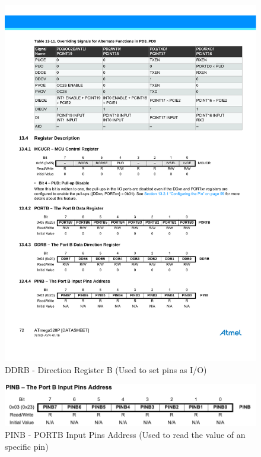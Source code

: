 \begin{figure}[H]
    \centering
    \includegraphics[width = \textwidth]{Graphics/MICROS/Practice 1/DATSHEET/DDRB.pdf}
    \caption{DDRB - Direction Register B (Used to set pins as I/O)}
    \label{fig:DDRB}
\end{figure}

\begin{figure}[H]
    \centering
    \includegraphics[width = \textwidth]{Graphics/MICROS/Practice 1/DATSHEET/PINB.pdf}
    \caption{PINB - PORTB Input Pins Address (Used to read the value of an specific pin)}
    \label{fig:PINB}
\end{figure}

